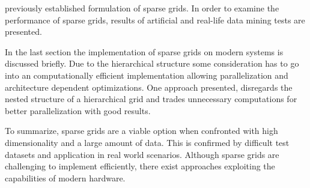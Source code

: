 \documentclass[a4paper]{scrartcl}
\begin{document}
previously established formulation of sparse grids. In order to examine
the performance of sparse grids, results of artificial and
real-life data mining tests are presented.
\par
In the last section the implementation of sparse grids on modern
systems is discussed briefly. Due to the hierarchical structure some
consideration has to go into an computationally efficient
implementation allowing
parallelization and architecture dependent optimizations.
One approach presented, disregards the nested structure of a hierarchical grid
and trades unnecessary computations for better parallelization with good
results.
\par
To summarize, sparse grids are a viable option when confronted with
high dimensionality and a large amount of data. This is confirmed by
difficult test datasets and application in real world scenarios. Although
sparse grids are challenging to implement efficiently, there exist approaches
exploiting the capabilities of modern hardware.
\end{document}
